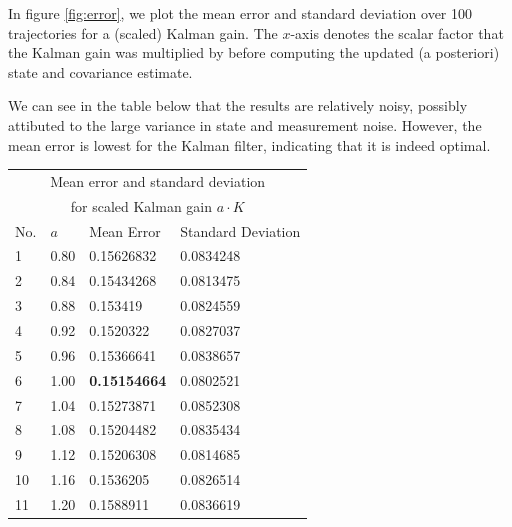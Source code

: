In figure \ref{fig:error}, we plot the mean error and standard deviation over 100 trajectories for a (scaled) Kalman gain. 
The $x$-axis denotes the scalar factor that the Kalman gain was multiplied by before computing the updated (a posteriori) state and covariance estimate. 

We can see in the table below that the results are relatively noisy, possibly attibuted to the large variance in state and measurement noise. 
However, the mean error is lowest for the Kalman filter, indicating that it is indeed optimal.

\begin{center}
    \begin{tabular}{ |p{2cm}||p{2cm}|p{4cm}|p{4cm}| }
    \hline
    \multicolumn{4}{|c|}{Mean error and standard deviation} \\
    \multicolumn{4}{|c|}{for scaled Kalman gain $a\cdot K$}\\
    \hline
    No.& $a$ & Mean Error & Standard Deviation \\
    \hline
    1 & 0.80 & 0.15626832 &          0.0834248\\
    2 & 0.84 & 0.15434268 &          0.0813475 \\
    3 & 0.88 & 0.153419 &            0.0824559   \\
    4 & 0.92 & 0.1520322 &           0.0827037 \\
    5 & 0.96 & 0.15366641 &          0.0838657 \\
    6 & 1.00 & \textbf{0.15154664} & 0.0802521 \\
    7 & 1.04 & 0.15273871 &          0.0852308 \\
    8 & 1.08 & 0.15204482 &          0.0835434 \\
    9 & 1.12 & 0.15206308 &          0.0814685 \\
    10 & 1.16 & 0.1536205 &          0.0826514 \\
    11 & 1.20 & 0.1588911 &          0.0836619 \\
    \hline
    \end{tabular}
    \end{center}

